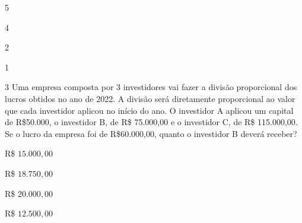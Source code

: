 \begin{escolha}
\item 5
\item 4
\item 2
\item 1
\end{escolha}



\num{3} Uma empresa composta por 3 investidores vai fazer a divisão
proporcional dos lucros obtidos no ano de 2022. A divisão será
diretamente proporcional ao valor que cada investidor aplicou no início
do ano. O investidor A aplicou um capital de R\$50.000, o investidor B,
de R\$ 75.000,00 e o investidor C, de R\$ 115.000,00. Se o lucro da
empresa foi de R\$60.000,00, quanto o investidor B deverá receber?

\begin{escolha}
\item R\$ $15.000,00$
\item R\$ $18.750,00$
\item R\$ $20.000,00$
\item R\$ $12.500,00$
\end{escolha}

